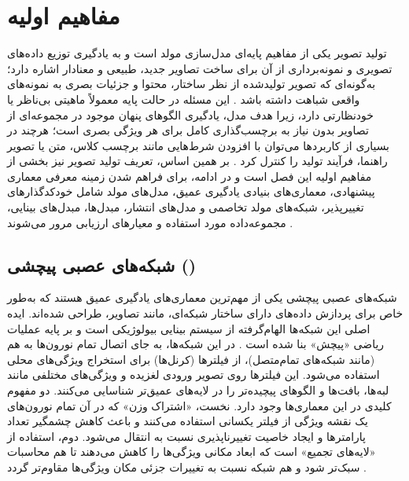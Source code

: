 \chapter{مفاهیم اولیه}
\label{chp1}

تولید تصویر یکی از مفاهیم پایه‌ای مدل‌سازی مولد است و به یادگیری توزیع داده‌های تصویری و نمونه‌برداری از آن برای ساخت تصاویر جدید، طبیعی و معنادار اشاره دارد؛ به‌گونه‌ای که تصویر تولیدشده از نظر ساختار، محتوا و جزئیات بصری به نمونه‌های واقعی شباهت داشته باشد \cite{chen2025diffusionImageGenerationSurvey,0214306}. این مسئله در حالت پایه معمولاً ماهیتی بی‌ناظر یا خودنظارتی دارد، زیرا هدف مدل، یادگیری الگوهای پنهان موجود در مجموعه‌ای از تصاویر بدون نیاز به برچسب‌گذاری کامل برای هر ویژگی بصری است؛ هرچند در بسیاری از کاربردها می‌توان با افزودن شرط‌هایی مانند برچسب کلاس، متن یا تصویر راهنما، فرآیند تولید را کنترل کرد \cite{8567753,9851474}. بر همین اساس، تعریف تولید تصویر نیز بخشی از مفاهیم اولیه این فصل است و در ادامه، برای فراهم شدن زمینه معرفی معماری پیشنهادی، معماری‌های بنیادی یادگیری عمیق، مدل‌های مولد شامل خودکدگذارهای تغییرپذیر، شبکه‌های مولد تخاصمی و مدل‌های انتشار، مبدل‌ها، مبدل‌های بینایی، مجموعه‌داده مورد استفاده و معیارهای ارزیابی مرور می‌شوند \cite{Kingma2013,Goodfellow2014,chen2025diffusionImageGenerationSurvey}.

\section{شبکه‌های عصبی پیچشی ()}
\label{sec:ch1-cnn}
شبکه‌های عصبی پیچشی یکی از مهم‌ترین معماری‌های یادگیری عمیق هستند که به‌طور خاص برای پردازش داده‌های دارای ساختار شبکه‌ای، مانند تصاویر، طراحی شده‌اند. ایده اصلی این شبکه‌ها الهام‌گرفته از سیستم بینایی بیولوژیکی است و بر پایه عملیات ریاضی «پیچش» بنا شده است \cite{726791}.
در این شبکه‌ها، به جای اتصال تمام نورون‌ها به هم (مانند شبکه‌های تمام‌متصل)، از فیلترها (کرنل‌ها) برای استخراج ویژگی‌های محلی استفاده می‌شود. این فیلترها روی تصویر ورودی لغزیده و ویژگی‌های مختلفی مانند لبه‌ها، بافت‌ها و الگوهای پیچیده‌تر را در لایه‌های عمیق‌تر شناسایی می‌کنند. دو مفهوم کلیدی در این معماری‌ها وجود دارد. نخست، «اشتراک وزن» که در آن تمام نورون‌های یک نقشه ویژگی از فیلتر یکسانی استفاده می‌کنند و باعث کاهش چشمگیر تعداد پارامترها و ایجاد خاصیت تغییرناپذیری نسبت به انتقال می‌شود. دوم، استفاده از «لایه‌های تجمیع» است که ابعاد مکانی ویژگی‌ها را کاهش می‌دهند تا هم محاسبات سبک‌تر شود و هم شبکه نسبت به تغییرات جزئی مکان ویژگی‌ها مقاوم‌تر گردد \cite{726791}.

